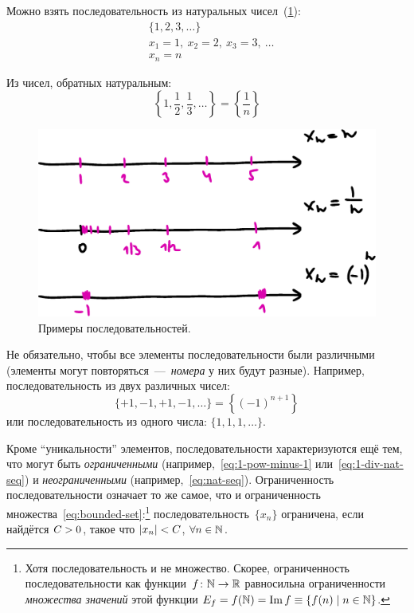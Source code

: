 \documentclass[a4paper,12pt]{article}
\DeclareMathOperator{\Imag}{Im}
\begin{document}
  \begin{example}
    Можно взять последовательность из натуральных чисел~(\ref{fig:sequence-examples}):
    \begin{equation}\label{eq:nat-seq}
      \begin{aligned}
        &\{1, 2, 3, \ldots\}\\
        &x_1 = 1,\ x_2 = 2,\ x_3 = 3,\ \ldots\\
        &x_n = n
      \end{aligned}
    \end{equation}
    
    Из чисел, обратных натуральным:
    \begin{equation}\label{eq:1-div-nat-seq}
      \left\{1, \frac{1}{2}, \frac{1}{3}, \ldots\right\} = \left\{\frac{1}{n}\right\}
    \end{equation}
    
    \begin{figure}[ht]
      \centering
      \includegraphics[width=0.8\linewidth]{images/sequence-examples}
      
      \caption{
        Примеры последовательностей.
      }
      \label{fig:sequence-examples}
    \end{figure}
    
    Не обязательно, чтобы все элементы последовательности были различными (элементы могут повторяться~---~\emph{номера} у них будут разные).
    Например, последовательность из двух различных чисел:
    \begin{equation}\label{eq:1-pow-minus-1}
      \{+1, -1, +1, -1, \ldots\} = \left\{(-1)^{n + 1}\right\}
    \end{equation}
    или последовательность из одного числа: $\{1, 1, 1, \ldots\}$.
  \end{example}
    
  Кроме ``уникальности'' элементов, последовательности характеризуются ещё тем, что могут быть \emph{ограниченными} (например,~\eqref{eq:1-pow-minus-1} или~\eqref{eq:1-div-nat-seq}) и \emph{неограниченными} (например,~\eqref{eq:nat-seq}).
  Ограниченность последовательности означает то же самое, что и ограниченность множества~\eqref{eq:bounded-set}:\footnote{
    Хотя последовательность и не множество.
    Скорее, ограниченность последовательности как функции~$f\colon \NN \hm\to \RR$ равносильна ограниченности \emph{множества значений} этой функции $E_f \hm= f(\NN) \hm= \Imag f \hm\equiv \{f(n) \hm\mid n \hm\in \NN\}$.
  }
  последовательность~$\{x_n\}$ ограничена, если найдётся $C \hm> 0$, такое что $|x_n| \hm< C$, $\forall n \hm\in \NN$.
  
\end{document}
